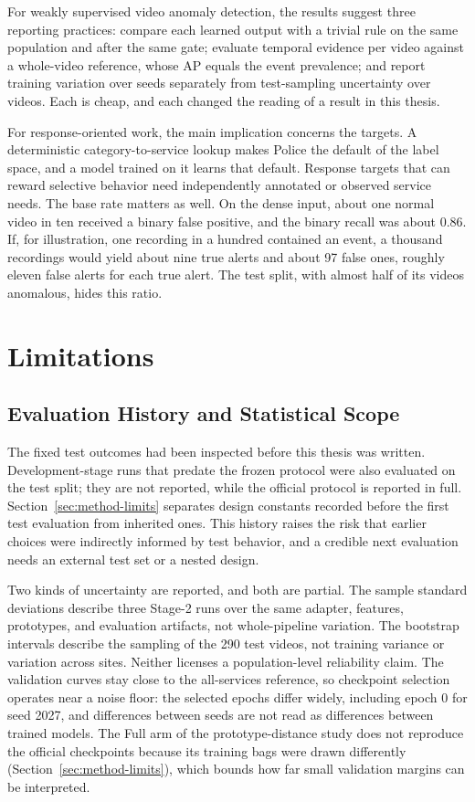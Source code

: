 For weakly supervised video anomaly detection, the results suggest three
reporting practices: compare each learned output with a trivial rule on the same
population and after the same gate; evaluate temporal evidence per video
against a whole-video reference, whose AP equals the event prevalence; and
report training variation over seeds separately from test-sampling uncertainty
over videos. Each is cheap, and each changed the reading of a result in this
thesis.

For response-oriented work, the main implication concerns the targets. A
deterministic category-to-service lookup makes Police the default of the label
space, and a model trained on it learns that default. Response targets that can
reward selective behavior need independently annotated or observed service
needs. The base rate matters as well. On the dense input, about one normal
video in ten received a binary false positive, and the binary recall was about
0.86. If, for illustration, one recording in a hundred contained an event, a
thousand recordings would yield about nine true alerts and about 97 false ones,
roughly eleven false alerts for each true alert. The test split, with almost
half of its videos anomalous, hides this ratio.

\section{Limitations}
\label{sec:discussion-limitations}

\subsection{Evaluation History and Statistical Scope}

The fixed test outcomes had been inspected before this thesis was written.
Development-stage runs that predate the frozen protocol were also evaluated on
the test split; they are not reported, while the official protocol is reported
in full. Section~\ref{sec:method-limits} separates design constants recorded
before the first test evaluation from inherited ones. This history raises the
risk that earlier choices were indirectly informed by test behavior, and a
credible next evaluation needs an external test set or a nested design.

Two kinds of uncertainty are reported, and both are partial. The sample
standard deviations describe three Stage-2 runs over the same adapter, features,
prototypes, and evaluation artifacts, not whole-pipeline variation. The bootstrap
intervals describe the sampling of the 290 test videos, not training variance or
variation across sites. Neither licenses a population-level reliability claim.
The validation curves stay close to the all-services reference, so checkpoint
selection operates near a noise floor: the selected epochs differ widely,
including epoch 0 for seed 2027, and differences between seeds are not read as
differences between trained models. The Full arm of the prototype-distance study
does not reproduce the official checkpoints because its training bags were drawn
differently (Section~\ref{sec:method-limits}), which bounds how far small
validation margins can be interpreted.

